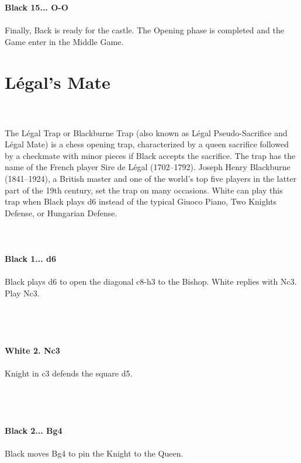 \documentclass{article}
\begin{document}
\textbf{Black 15... O-O}\\
\\
Finally, Back is ready for the castle. The Opening phase is completed and the Game enter in the Middle Game.\section{ Légal's Mate}

\\
\\
The Légal Trap or Blackburne Trap (also known as Légal Pseudo-Sacrifice and Légal Mate) is a chess opening trap, characterized by a queen sacrifice followed by a checkmate with minor pieces if Black accepts the sacrifice. The trap has the name of the French player Sire de Légal (1702–1792). Joseph Henry Blackburne (1841–1924), a British master and one of the world's top five players in the latter part of the 19th century, set the trap on many occasions. White can play this trap when Black plays d6 instead of the typical Giuoco Piano, Two Knights Defense, or Hungarian Defense.\\
\\

\\
\\
\textbf{Black 1... d6}\\
\\
Black plays d6 to open the diagonal c8-h3 to the Bishop. White replies with Nc3. Play Nc3.\\\\
\\

\\
\\
\textbf{White 2. Nc3}\\
\\
Knight in c3 defends the square d5.\\\\
\\

\\
\\
\textbf{Black 2... Bg4}\\
\\
Black moves Bg4 to pin the Knight to the Queen.\\
\\

\\
\\
\end{document}
